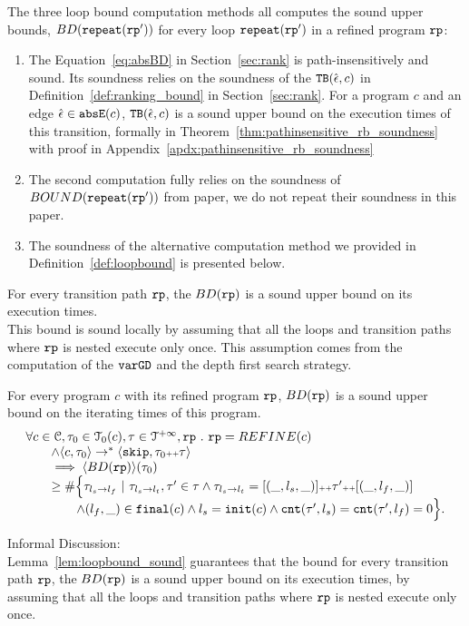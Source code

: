 
The three loop bound computation methods all computes the sound upper bounds, $BD(\mathtt{repeat}(\mathtt{rp}'))$ for every loop $\mathtt{repeat}(\mathtt{rp}')$ in a refined program $\mathtt{rp}$:
\begin{enumerate}
    \item The Equation~\ref{eq:absBD} in Section~\ref{sec:rank} is path-insensitively and sound.
    Its soundness relies on the soundness of the ${\mathtt{TB}}(\hat{\mathtt{\epsilon}{}}, c)$ in Definition~\ref{def:ranking_bound} in Section~\ref{sec:rank}.
    For a program $c$ and an edge $\hat{\mathtt{\epsilon}{}} \in \mathtt{abs}{\mathtt{E}}(c)$, ${\mathtt{TB}}(\hat{\mathtt{\epsilon}{}}, c)$ is a sound upper bound on the execution times of this transition, formally in Theorem~\ref{thm:pathinsensitive_rb_soundness} with proof in Appendix~\ref{apdx:pathinsensitive_rb_soundness}    
    \item The second computation fully relies on the soundness of $BOUND(\mathtt{repeat}(\mathtt{rp}'))$ from paper\cite{GulwaniJK09}, we do not repeat their soundness in this paper.
    \item   The soundness of the alternative computation method we provided in Definition~\ref{def:loopbound} is presented below.
  \end{enumerate}

For every transition path $\mathtt{rp}$, the $BD(\mathtt{rp})$
is a sound upper bound on its execution times.
\\
This bound is sound locally by assuming
that all the loops and transition paths where $\mathtt{rp}$ is nested execute only once.
This assumption comes from the computation of the $\mathtt{varGD}$ and the depth first search strategy.
\\
%
\begin{lemma}
    For every program $c$ with its refined program $\mathtt{rp}$,
    $BD(\mathtt{rp})$ is a sound upper bound on the iterating times of this program.
    \[
      \begin{array}{l}
      \forall c \in \mathcal{C}, \mathtt{\tau}_0 \in \mathcal{T}_0(c), \mathtt{\tau} \in \mathcal{T}^{+\infty}, \mathtt{rp} ~.~ 
      \mathtt{rp} = REFINE(c)
      \\ \qquad
      \land 
      \langle c, \mathtt{\tau}_0 \rangle \to^* 
      \langle \mathtt{skip}, \mathtt{\tau}_0 {\scriptscriptstyle ++} \mathtt{\tau} \rangle
      \\ \qquad
      \implies
      \langle BD(\mathtt{rp}) \rangle(\mathtt{\tau}_0) 
      \\ \qquad \geq 
      \# \Big\{\mathtt{\tau}_{l_s \to l_f} ~\vert~ \mathtt{\tau}_{l_s \to l_t}, \mathtt{\tau}' \in \mathtt{\tau} \land \mathtt{\tau}_{l_s \to l_t} = [(\_, l_s, \_)] {\scriptscriptstyle ++} \mathtt{\tau}' {\scriptscriptstyle ++} [(\_, l_f, \_)]
      \\ \qquad \qquad
      \land (l_{f}, \_) \in \mathtt{final}(c)
      \land l_s = \mathtt{init}(c)
      \land \mathtt{cnt}(\mathtt{\tau}', l_s) = \mathtt{cnt}(\mathtt{\tau}', l_f) = 0 
      \Big\}.
      \end{array}
    \]
    \end{lemma}
    Informal Discussion:
    \\
  Lemma~\ref{lem:loopbound_sound} guarantees that
  the bound for every transition path $\mathtt{rp}$, the $BD(\mathtt{rp})$
  is a sound upper bound on its execution times, by assuming
  that all the loops and transition paths where $\mathtt{rp}$ is nested execute only once.
  
